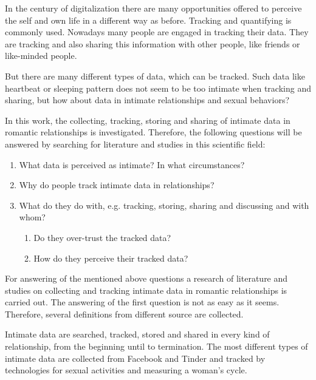 
In the century of digitalization there are many opportunities offered to perceive the self and own life in a different way as before. Tracking and quantifying is commonly used. Nowadays many people are engaged in tracking their data. They are tracking and also sharing this information with other people, like friends or like-minded people. 



But there are many different types of data, which can be tracked. Such data like heartbeat or sleeping pattern does not seem to be too intimate when tracking and sharing, but how about data in intimate relationships and sexual behaviors? 


In this work, the collecting, tracking, storing and sharing of intimate data in romantic relationships is investigated.
Therefore, the following questions will be answered by searching for  literature and studies in this scientific field:
 \begin{enumerate}
 	\item What data is perceived as intimate? In what circumstances?
 	\item Why do people track intimate data in relationships?
 	\item What do they do with, e.g. tracking, storing, sharing and discussing and with whom?
 	\begin{enumerate}
 		\item Do they over-trust the tracked data?
 		\item How do they perceive their tracked data?
 	\end{enumerate}
 \end{enumerate}
For answering of the mentioned above questions a research of literature and studies on collecting and tracking intimate data in romantic relationships is carried out. The answering of the first question is not as easy as it seems. Therefore, several definitions from different source are collected.

Intimate data are searched, tracked, stored and shared in every kind of relationship, from the beginning until to termination.
The most different types of intimate data are collected from Facebook and Tinder and tracked by technologies for sexual activities and measuring a woman's cycle.


